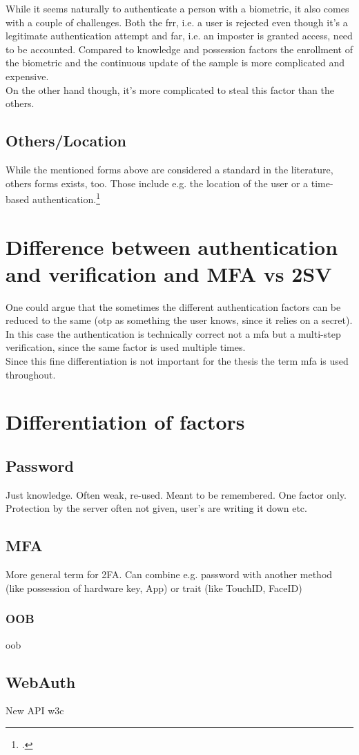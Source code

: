 While it seems naturally to authenticate a person with a biometric, it also comes with a couple of challenges. Both the \gls{frr}, i.e. a user is rejected even though it's a legitimate authentication attempt and \gls{far}, i.e. an imposter is granted access, need to be accounted. Compared to knowledge and possession factors the enrollment of the biometric and the continuous update of the sample is more complicated and expensive.\\
On the other hand though, it's more complicated to steal this factor than the others.

\subsection{Others/Location}

While the mentioned forms above are considered a standard in the literature, others forms exists, too. Those include e.g. the location of the user or a time-based authentication.\footcite[See][191]{dasgupta2017multi}

\section{Difference between authentication and verification and MFA vs 2SV}

One could argue that the sometimes the different authentication factors can be reduced to the same (\gls{otp} as something the user knows, since it relies on a secret).\\
In this case the authentication is technically correct not a \gls{mfa} but a multi-step verification, since the same factor is used multiple times.\\
Since this fine differentiation is not important for the thesis the term \gls{mfa} is used throughout.

\section{Differentiation of factors}

\subsection{Password}

Just knowledge. Often weak, re-used. Meant to be remembered. One factor only.\\
Protection by the server often not given, user's are writing it down etc.

\subsection{MFA}

More general term for 2FA. Can combine e.g. password with another method (like possession of hardware key, App) or trait (like TouchID, FaceID)

\subsubsection{OOB}

\gls{oob}

\subsection{WebAuth}

New API \gls{w3c}